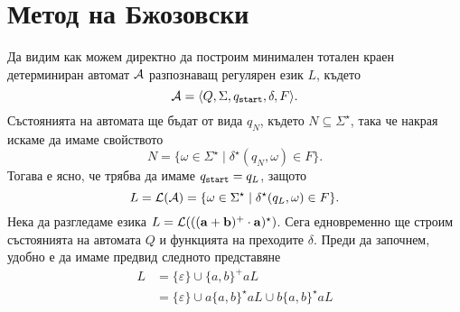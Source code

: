 \section{Метод на Бжозовски}\label{sect:regular:brzozowski}


Да видим как можем директно да построим минимален тотален краен детерминиран автомат $\mathcal{A}$
разпознаващ регулярен език $L$, където \[\mathcal{A} = \langle{Q,\Sigma,q_{\texttt{start}},\delta,F}\rangle.\]
Състоянията на автомата ще бъдат от вида $q_N$, където $N \subseteq \Sigma^\star$, така че накрая искаме да имаме свойството
\[N = \{\omega \in \Sigma^\star \mid \delta^\star(q_N,\omega) \in F\}.\]
Тогава е ясно, че трябва да имаме $q_{\texttt{start}} = q_L$, защото 
\[L = \mathcal{L}(\mathcal{A}) = \{\omega \in \Sigma^\star \mid \delta^\star(q_L,\omega) \in F\}.\]
Нека да разгледаме езика $L = \mathcal{L}(\mathbf{((a+b)^+\cdot a)^\star})$.
Сега едновременно ще строим състоянията на автомата $Q$ и функцията на преходите $\delta$.
Преди да започнем, удобно е да имаме предвид следното представяне
\begin{align*}
  L & = \{\varepsilon\} \cup \{a,b\}^+ a L\\
  & = \{\varepsilon\} \cup a\{a,b\}^\star aL \cup b\{a,b\}^\star aL
\end{align*}

